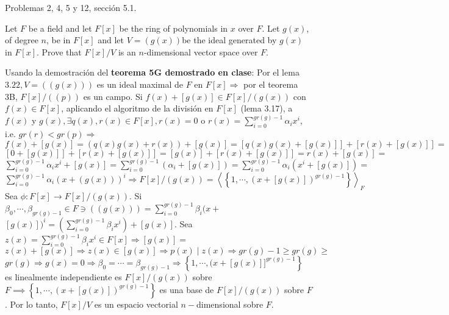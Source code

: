 




Problemas 2, 4, 5 y 12, sección 5.1.


\begin{problema}[Problema 2]
    Let $F$ be a field and let $F[x]$ be the ring of polynomials in $x$ over $F$. Let $g(x)$, of degree $n$, be in $F[x]$ and let $V = (g(x)) $be the ideal generated by $g(x)$ in $F[x]$. Prove that $F[x]/V$ is an $n$-dimensional vector space over $F$.
    \begin{dem}
        Usando la demostración del \textbf{teorema 5G demostrado en clase}: 
        Por el lema $3.22, V=((g(x)))$ es un ideal maximal de $F$ en $F[x] \Longrightarrow$ por el teorema 3B, $F[x] /((p))$ es un campo. Si $f(x)+[g(x)] \in F[x] /(g(x))$ con $f(x) \in F[x]$, aplicando el algoritmo de la división en $F[x]$ (lema 3.17), a $f(x)$ y $g(x), \exists q(x), r(x) \in F[x], r(x)=0$ o $r(x)=\sum_{i=0}^{g r(g)-1} \alpha_i x^i$, i.e. $gr(r)<gr(p) \Longrightarrow$ $f(x)+[g(x)]=(q(x) g(x)+r(x))+[g(x)]=[q(x) g(x)+[g(x)]]+[r(x)+[g(x)]]=$ $[0+[g(x)]]+[r(x)+[g(x)]]=[g(x)]+[r(x)+[g(x)]]=r(x)+[g(x)]=$ $\sum_{i=0}^{g r(g)-1} \alpha_i x^i+[g(x)]=\sum_{i=0}^{g r(g)-1}\left(\alpha_i+[g(x)]\right)=\sum_{i=0}^{g r(g)-1} \alpha_i\left(x^i+[g(x)]\right)=$ $\sum_{i=0}^{g r(g)-1} \alpha_i(x+(g(x)))^i \Longrightarrow F[x] /(g(x))=\left\langle\left\{1, \cdots,(x+[g(x)])^{g r(g)-1}\right\}\right\rangle_F$ Sea $\phi: F[x] \rightarrow F[x] /(g(x))$. Si $\beta_0, \cdots, \beta_{g r(g)-1} \in F \ni((g(x)))=\sum_{i=0}^{g r(g)-1} \beta_i(x+$ $[g(x)])^i=\left(\sum_{i=0}^{g r(g)-1} \beta_i x^i\right)+[g(x)]$. Sea $z(x)=\sum_{i=0}^{g r(g)-1} \beta_i x^i \in F[x] \Longrightarrow[g(x)]=$ $z(x)+[g(x)] \Longrightarrow z(x) \in[g(x)] \Longrightarrow p(x) \mid z(x) \Longrightarrow g r(g)-1 \geq g r(g) \geq$ $g r(g) \Longrightarrow g(x)=0 \Longrightarrow \beta_0=\cdots=\beta_{g r(g)-1} \Longrightarrow\left\{1, \cdots,(x+[g(x)]]^{g r(g)-1}\right\}$ es linealmente independiente es $F[x] /(g(x))$ sobre $F \implies \left\{1, \cdots,(x+[g(x)])^{g r(g)-1}\right\}$ es una base de $F[x] /(g(x))$ sobre $F$. Por lo tanto, $F[x]/V$ es un espacio vectorial $n-$dimensional sobre $F$.  
    \end{dem}

\end{problema}

